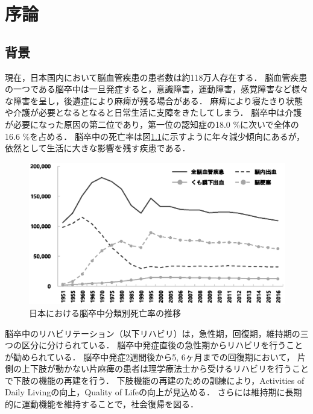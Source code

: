 \chapter{序論}
\label{chap:introduction}
\minitoc

\thispagestyle{empty}

\newpage
\section{背景}
\label{sec:background_chap1}
現在，日本国内において脳血管疾患の患者数は約118万人存在する\cite{厚労省2014}．
脳血管疾患の一つである脳卒中は一旦発症すると，意識障害，運動障害，感覚障害など様々な障害を呈し，後遺症により麻痺が残る場合がある．
麻痺により寝たきり状態や介護が必要となるとなると日常生活に支障をきたしてしまう．
脳卒中は介護が必要になった原因の第二位であり，第一位の認知症の18.0 \%に次いで全体の16.6 \%を占める\cite{厚労省2016}．
脳卒中の死亡率は図\ref{fig:number_death}に示すように年々減少傾向にあるが，依然として生活に大きな影響を残す疾患である．

\begin{figure}[b]
\begin{center}
\includegraphics[width=0.95\linewidth]{./Chap1/fig/number_death.eps}
\caption{日本における脳卒中分類別死亡率の推移}
\label{fig:number_death}
\end{center}
\end{figure}

脳卒中のリハビリテーション（以下リハビリ）は，急性期，回復期，維持期の三つの区分に分けられている．
脳卒中発症直後の急性期からリハビリを行うことが勧められている\cite{脳卒中2009}．
脳卒中発症2週間後から5, 6ヶ月までの回復期において，
片側の上下肢が動かない片麻痺の患者は理学療法士から受けるリハビリを行うことで下肢の機能の再建を行う．
下肢機能の再建のための訓練により，Activities of Daily Livingの向上，Quality of Lifeの向上が見込める．
さらには維持期に長期的に運動機能を維持することで，社会復帰を図る．

